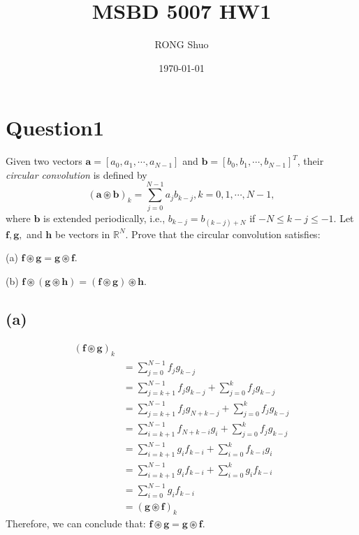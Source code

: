 \documentclass{article}
\title{MSBD 5007 HW1}
\author{RONG Shuo}
\date{\today}
\newcommand{\R}{\mathbb{R}}
\begin{document}
\maketitle

\section*{Question1}
Given two vectors \(\bm{a} = [a_0, a_1, \cdots, a_{N - 1}]\) and \(\bm{b} = [b_0, b_1, \cdots, b_{N-1}]^T\), their \textit{circular convolution} is defined by
\[(\bm{a} \circledast\bm{b})_k = \sum_{j = 0}^{N - 1} a_j b_{k - j}, k = 0, 1, \cdots, N - 1,\]
where \(\bm{b}\) is extended periodically, i.e., \(b_{k - j} = b_{(k - j) + N}\) if \(-N \leq k-j \leq -1\). Let \(\bm{f}, \bm{g}, \) and \(\bm{h}\) be vectors in \(\R^N\). Prove that the circular convolution satisfies:

\noindent 
(a) \(\bm{f}\circledast  \bm{g} = \bm{g} \circledast \bm{f}\). 

\noindent 
(b) \(\bm{f}\circledast (\bm{g} \circledast \bm{h}) = (\bm{f} \circledast \bm{g}) \circledast \bm{h}\). 
\subsection*{(a)}
\begin{align*}
    (\bm{f} \circledast\bm{g})_k & \\  
    &= \sum_{j = 0}^{N - 1} f_j g_{k - j} \\
    &= \sum_{j = k + 1}^{N - 1} f_j g_{k - j} + \sum_{j = 0}^{k} f_j g_{k - j}  \\
    &= \sum_{j = k + 1}^{N - 1} f_j g_{N + k - j} + \sum_{j = 0}^{k} f_j g_{k - j}  \\
    &= \sum_{i = k + 1}^{N - 1} f_{N + k - i} g_{i} + \sum_{j = 0}^{k} f_j g_{k - j}  \\
    &= \sum_{i = k + 1}^{N - 1}  g_{i} f_{k - i} + \sum_{i = 0}^{k} f_{k - i} g_i  \\
    &= \sum_{i = k + 1}^{N - 1}  g_{i} f_{k - i} + \sum_{i = 0}^{k} g_i f_{k - i}  \\
    &= \sum_{i = 0}^{N - 1} g_{i} f_{k - i} \\
    &= (\bm{g} \circledast \bm{f})_k
\end{align*}
Therefore, we can conclude that: \(\bm{f}\circledast  \bm{g} = \bm{g} \circledast \bm{f}\). 
\end{document}
